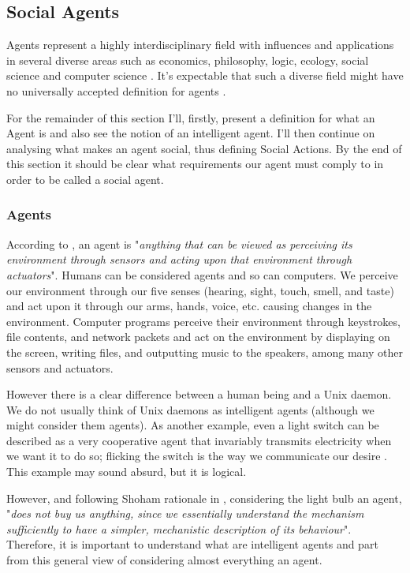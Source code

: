 \subsection{Social Agents}
\label{sec:social-agents}
Agents represent a highly interdisciplinary field with influences and applications in several diverse areas such as economics, philosophy, logic, ecology, social science and computer science \cite{wooldridge:multiagent-systems}.
It's expectable that such a diverse field might have no universally accepted definition for agents \cite{wooldridge:intelligentagents}.

For the remainder of this section I'll, firstly, present a definition for what an Agent is and also see the notion of an intelligent agent.
I'll then continue on analysing what makes an agent social, thus defining Social Actions.
By the end of this section it should be clear what requirements our agent must comply to in order to be called a social agent.

\subsubsection{Agents}
According to \cite{russell&norvig:aima}, an agent is "\textit{anything that can be viewed as perceiving its environment through sensors and acting upon that environment through actuators}".
Humans can be considered agents and so can computers.
We perceive our environment through our five senses (hearing, sight, touch, smell, and taste) and act upon it through our arms, hands, voice, etc. causing changes in the environment.
Computer programs perceive their environment through keystrokes, file contents, and network packets and act on the environment by displaying on the screen, writing files, and outputting music to the speakers, among many other sensors and actuators.

However there is a clear difference between a human being and a Unix daemon.
We do not usually think of Unix daemons as intelligent agents (although we might consider them agents).
As another example, even a light switch can be described as a very cooperative agent that invariably transmits electricity when we want it to do so; flicking the switch is the way we communicate our desire \cite{shoham:agentorientedprogramming}.
This example may sound absurd, but it is logical.

However, and following Shoham rationale in \cite{shoham:agentorientedprogramming}, considering the light bulb an agent, "\textit{does not buy us anything, since we essentially understand the mechanism sufficiently to have a simpler, mechanistic description of its behaviour}".
Therefore, it is important to understand what are intelligent agents and part from this general view of considering almost everything an agent.

